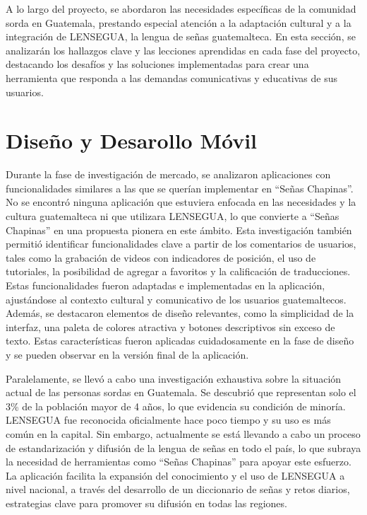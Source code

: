 A lo largo del proyecto, se abordaron las necesidades específicas de la comunidad sorda en Guatemala, prestando especial atención a la adaptación cultural y a la integración de LENSEGUA, la lengua de señas guatemalteca. En esta sección, se analizarán los hallazgos clave y las lecciones aprendidas en cada fase del proyecto, destacando los desafíos y las soluciones implementadas para crear una herramienta que responda a las demandas comunicativas y educativas de sus usuarios.


\section{Diseño y Desarollo Móvil}

Durante la fase de investigación de mercado, se analizaron aplicaciones con funcionalidades similares a las que se querían implementar en ``Señas Chapinas''. No se encontró ninguna aplicación que estuviera enfocada en las necesidades y la cultura guatemalteca ni que utilizara LENSEGUA, lo que convierte a ``Señas Chapinas'' en una propuesta pionera en este ámbito. Esta investigación también permitió identificar funcionalidades clave a partir de los comentarios de usuarios, tales como la grabación de videos con indicadores de posición, el uso de tutoriales, la posibilidad de agregar a favoritos y la calificación de traducciones. Estas funcionalidades fueron adaptadas e implementadas en la aplicación, ajustándose al contexto cultural y comunicativo de los usuarios guatemaltecos. Además, se destacaron elementos de diseño relevantes, como la simplicidad de la interfaz, una paleta de colores atractiva y botones descriptivos sin exceso de texto. Estas características fueron aplicadas cuidadosamente en la fase de diseño y se pueden observar en la versión final de la aplicación.

Paralelamente, se llevó a cabo una investigación exhaustiva sobre la situación actual de las personas sordas en Guatemala. Se descubrió que representan solo el 3\% de la población mayor de 4 años, lo que evidencia su condición de minoría. LENSEGUA fue reconocida oficialmente hace poco tiempo y su uso es más común en la capital. Sin embargo, actualmente se está llevando a cabo un proceso de estandarización y difusión de la lengua de señas en todo el país, lo que subraya la necesidad de herramientas como ``Señas Chapinas'' para apoyar este esfuerzo. La aplicación facilita la expansión del conocimiento y el uso de LENSEGUA a nivel nacional, a través del desarrollo de un diccionario de señas y retos diarios, estrategias clave para promover su difusión en todas las regiones.


